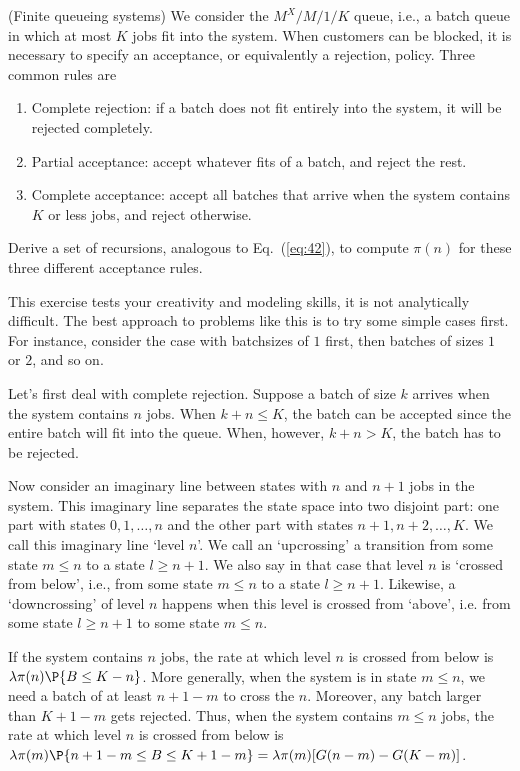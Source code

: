 \begin{question}(Finite queueing systems) We consider the $M^X/M/1/K$
queue, i.e., a batch queue in which at most $K$ jobs fit into the
system. When customers can be blocked, it is necessary to specify an
acceptance, or equivalently a rejection, policy. Three common rules are
\begin{enumerate}
\item Complete rejection: if a batch does not fit entirely into the system, it will be rejected completely.
\item Partial acceptance: accept whatever fits of a batch, and reject the rest.
\item Complete acceptance: accept all batches that arrive when the
  system contains $K$ or less jobs, and reject otherwise.
\end{enumerate}
 Derive a set of recursions, analogous to Eq.~(\ref{eq:42}),
to compute $\pi(n)$ for these three different acceptance rules.
\begin{solution}
  This exercise tests your creativity and modeling skills, it is not
  analytically difficult.  The best approach to problems like this is
  to try some simple cases first. For instance, consider the case with
  batchsizes of $1$ first, then batches of sizes $1$ or $2$, and so
  on.

  Let's first deal with complete rejection. Suppose a batch of size
  $k$ arrives when the system contains $n$ jobs. When $k+n \leq K$,
  the batch can be accepted since the entire batch will fit into the
  queue.  When, however, $k+n> K$, the batch has to be rejected. 

  Now consider an imaginary line between states with $n$ and $n+1$
  jobs in the system. This imaginary line separates the state space
  into two disjoint part: one part with states $0, 1, \ldots, n$ and
  the other part with states $n+1, n+2, \ldots, K$. We call this
  imaginary line `level $n$'.  We call an `upcrossing' a transition
  from some state $m\leq n$ to a state $l\geq n+1$. We also say in
  that case that level $n$ is `crossed from below', i.e., from some
  state $m\leq n$ to a state $l\geq n+1$. Likewise, a `downcrossing'
  of level $n$ happens when this level is crossed from `above',
  i.e. from some state $l\geq n+1$ to some state $m\leq n$.


  If the system contains $n$ jobs, the rate at which level $n$ is
  crossed from below is $\lambda \pi(n) \P{B \leq K-n}$.  More generally,
  when the system is in state $m\leq n$, we need a batch of at least
  $n+1-m$ to cross the $n$. Moreover, any batch larger than $K+1-m$
  gets rejected. Thus, when the system contains $m \leq n $ jobs, the
  rate at which level $n$ is crossed from below is
  $\lambda \pi(m) \P{n+1-m\leq B \leq K+1-m} = \lambda \pi(m)
  [G(n-m)-G(K-m)]$.


\end{solution}
\end{question}
